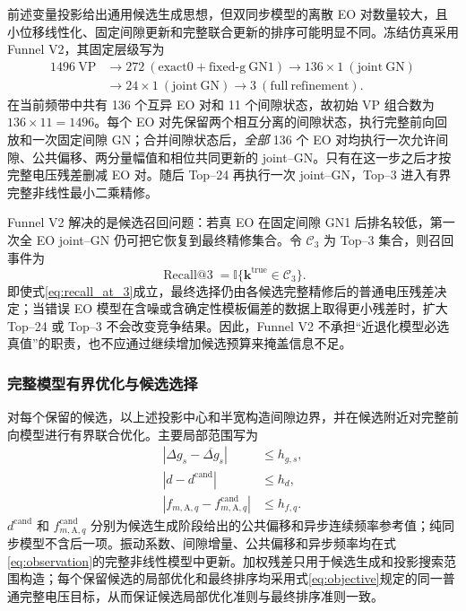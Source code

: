 \documentclass[UTF8,12pt,a4paper]{ctexart}
\begin{document}
前述变量投影给出通用候选生成思想，但双同步模型的离散 EO 对数量较大，且小位移线性化、固定间隙更新和完整联合更新的排序可能明显不同。冻结仿真采用 Funnel V2，其固定层级写为
\begin{equation}
\begin{aligned}
1496\ \mathrm{VP}
&\rightarrow272\ (\mathrm{exact0+fixed\text{-}g\ GN1})
\rightarrow136\times1\ (\mathrm{joint\ GN})\\
&\rightarrow24\times1\ (\mathrm{joint\ GN})
\rightarrow3\ (\mathrm{full\ refinement}).
\end{aligned}
\label{eq:funnel_v2}
\end{equation}
在当前频带中共有 136 个互异 EO 对和 11 个间隙状态，故初始 VP 组合数为 $136\times11=1496$。每个 EO 对先保留两个相互分离的间隙状态，执行完整前向回放和一次固定间隙 GN；合并间隙状态后，\emph{全部} 136 个 EO 对均执行一次允许间隙、公共偏移、两分量幅值和相位共同更新的 joint--GN。只有在这一步之后才按完整电压残差删减 EO 对。随后 Top--24 再执行一次 joint--GN，Top--3 进入有界完整非线性最小二乘精修。

Funnel V2 解决的是候选召回问题：若真 EO 在固定间隙 GN1 后排名较低，第一次全 EO joint--GN 仍可把它恢复到最终精修集合。令 $\mathcal C_3$ 为 Top--3 集合，则召回事件为
\begin{equation}
\operatorname{Recall@3}
=\mathbb I\{\bm k^{\mathrm{true}}\in\mathcal C_3\}.
\label{eq:recall_at_3}
\end{equation}
即使式\eqref{eq:recall_at_3}成立，最终选择仍由各候选完整精修后的普通电压残差决定；当错误 EO 模型在含噪或含确定性模板偏差的数据上取得更小残差时，扩大 Top--24 或 Top--3 不会改变竞争结果。因此，Funnel V2 不承担“近退化模型必选真值”的职责，也不应通过继续增加候选预算来掩盖信息不足。

\subsubsection{完整模型有界优化与候选选择}

对每个保留的候选，以上述投影中心和半宽构造间隙边界，并在候选附近对完整前向模型进行有界联合优化。主要局部范围写为
\begin{equation}
\begin{aligned}
|\Delta g_s-\overline{\Delta g}_s|&\leq h_{g,s},\\
|d-d^{\mathrm{cand}}|&\leq h_d,\\
|f_{m,\mathrm A,q}-f_{m,\mathrm A,q}^{\mathrm{cand}}|&\leq h_{f,q}.
\end{aligned}
\label{eq:search_domain}
\end{equation}
$d^{\mathrm{cand}}$ 和 $f_{m,\mathrm A,q}^{\mathrm{cand}}$ 分别为候选生成阶段给出的公共偏移和异步连续频率参考值；纯同步模型不含后一项。振动系数、间隙增量、公共偏移和异步频率均在式\eqref{eq:observation}的完整非线性模型中更新。加权残差只用于候选生成和投影搜索范围构造；每个保留候选的局部优化和最终排序均采用式\eqref{eq:objective}规定的同一普通完整电压目标，从而保证候选局部优化准则与最终排序准则一致。
\end{document}
